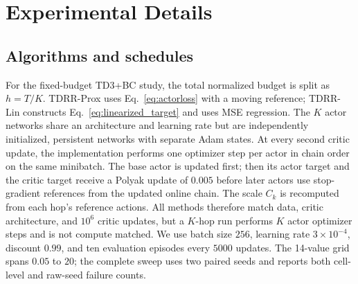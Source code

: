 \documentclass[letterpaper]{article}
\begin{document}
\section{Experimental Details}
\label{app:experiments}

\subsection{Algorithms and schedules}
For the fixed-budget TD3+BC study, the total normalized budget is split as
$h=T/K$. TDRR-Prox uses Eq.~\eqref{eq:actorloss} with a moving reference;
TDRR-Lin constructs Eq.~\eqref{eq:linearized_target} and uses MSE regression.
The $K$ actor networks share an architecture and learning rate but are
independently initialized, persistent networks with separate Adam states.
At every second critic update, the implementation performs one optimizer step
per actor in chain order on the same minibatch. The base actor is updated first;
then its actor target and the critic target receive a Polyak update of $0.005$
before later actors use stop-gradient references from the updated online chain.
The scale $C_k$ is recomputed from each hop's reference actions. All methods
therefore match data, critic architecture, and $10^6$ critic updates, but a
$K$-hop run performs $K$ actor optimizer steps and is not compute matched.
We use batch size $256$, learning rate $3\times10^{-4}$, discount $0.99$, and
ten evaluation episodes every $5000$ updates. The 14-value grid spans $0.05$ to
$20$; the complete sweep uses two paired seeds and reports both cell-level and raw-seed failure counts.
\end{document}
